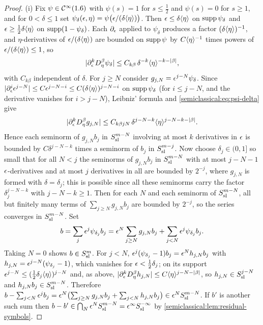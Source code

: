 \begin{proof}
  (i) Fix $\psi\in\mathcal{C}^\infty(1.6)$ with $\psi(s)=1$ for $s\le\frac12$ and $\psi(s)=0$ for
  $s\ge1$, and for $0<\delta\le1$ set $\psi_\delta(\epsilon,\eta)=\psi\bigl(\epsilon/(\delta\langle \eta\rangle)\bigr)$.
  Then $\epsilon\le\delta\langle \eta\rangle$ on $\operatorname{supp}\psi_\delta$ and
  $\epsilon\ge\frac12\delta\langle \eta\rangle$ on $\operatorname{supp}(1-\psi_\delta)$. Each $\partial_\epsilon$
  applied to $\psi_\delta$ produces a factor $(\delta\langle \eta\rangle)^{-1}$, and
  $\eta$-derivatives of $\epsilon/(\delta\langle \eta\rangle)$ are bounded on $\operatorname{supp}\psi$ by
  $C\langle \eta\rangle^{-1}$ times powers of $\epsilon/(\delta\langle \eta\rangle)\le1$, so
  \begin{equation}\label{semiclassical:eq:psi-delta}
    \lvert \partial_\epsilon^kD^\beta_\eta\psi_\delta\rvert\le C_{k\beta}\,\delta^{-k}\langle \eta\rangle^{-k-\lvert \beta\rvert},
  \end{equation}
  with $C_{k\beta}$ independent of $\delta$. For $j\ge N$ consider
  $g_{j,N}=\epsilon^{j-N}\psi_\delta$. Since $\lvert \partial^i_\epsilon\epsilon^{j-N}\rvert\le
  C\epsilon^{j-N-i}\le C(\delta\langle \eta\rangle)^{j-N-i}$ on $\operatorname{supp}\psi_\delta$ (for $i\le j-N$,
  and the derivative vanishes for $i>j-N$), Leibniz' formula and
  \eqref{semiclassical:eq:psi-delta} give
  \begin{equation*}
    \lvert \partial_\epsilon^kD^\beta_\eta g_{j,N}\rvert\le C_{k\beta jN}\,\delta^{j-N-k}\langle \eta\rangle^{j-N-k-\lvert \beta\rvert}.
  \end{equation*}
  Hence each seminorm of $g_{j,N}b_j$ in $S^{m-N}_{\mathrm{sl}}$ involving at most $k$
  derivatives in $\epsilon$ is bounded by $C\delta^{j-N-k}$ times a seminorm of
  $b_j$ in $S^{m-j}_{\mathrm{sl}}$. Now choose $\delta_j\in(0,1]$ so small that for all
  $N<j$ the seminorms of $g_{j,N}b_j$ in $S^{m-N}_{\mathrm{sl}}$ with at most $j-N-1$
  $\epsilon$-derivatives and at most $j$ derivatives in all are bounded by $2^{-j}$,
  where $g_{j,N}$ is formed with $\delta=\delta_j$; this is possible since all
  these seminorms carry the factor $\delta_j^{j-N-k}$ with $j-N-k\ge1$. Then
  for each $N$ and each seminorm of $S^{m-N}_{\mathrm{sl}}$, all but finitely many terms
  of $\sum_{j\ge N}g_{j,N}b_j$ are bounded by $2^{-j}$, so the series converges
  in $S^{m-N}_{\mathrm{sl}}$. Set
  \begin{equation*}
    b=\sum_j\epsilon^j\psi_{\delta_j}b_j=\epsilon^N\sum_{j\ge N}g_{j,N}b_j+\sum_{j<N}\epsilon^j\psi_{\delta_j}b_j .
  \end{equation*}
  Taking $N=0$ shows $b\in S^{m}_{\mathrm{sl}}$. For $j<N$,
  $\epsilon^j(\psi_{\delta_j}-1)b_j=\epsilon^N h_{j,N}b_j$ with
  $h_{j,N}=\epsilon^{j-N}(\psi_{\delta_j}-1)$, which vanishes for $\epsilon<\frac12\delta_j$;
  on its support $\epsilon^{j-N}\le(\frac12\delta_j\langle \eta\rangle)^{j-N}$ and, as above,
  $\lvert \partial^k_\epsilon D^\beta_\eta h_{j,N}\rvert\le C\langle \eta\rangle^{j-N-\lvert \beta\rvert}$, so
  $h_{j,N}\in S^{j-N}_{\mathrm{sl}}$ and $h_{j,N}b_j\in S^{m-N}_{\mathrm{sl}}$. Therefore
  $b-\sum_{j<N}\epsilon^jb_j=\epsilon^N\bigl(\sum_{j\ge N}g_{j,N}b_j+\sum_{j<N}h_{j,N}b_j\bigr)
  \in\epsilon^NS^{m-N}_{\mathrm{sl}}$. If $b'$ is another such sum then
  $b-b'\in\bigcap_N\epsilon^NS^{m-N}_{\mathrm{sl}}=\epsilon^\infty S^{-\infty}_{\mathrm{sl}}$ by
  \cref{semiclassical:lem:residual-symbols}.


\end{proof}
